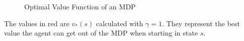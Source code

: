 \begin{figure}[H]
\begin{tikzpicture}[x=0.75pt,y=0.75pt,yscale=-1,xscale=1]
\end{tikzpicture}
\caption{Optimal Value Function of an MDP}
\label{optimalvaluefunction}
\end{figure}

The values in red are $v_*(s)$ calculated with $\gamma = 1$. They represent the best value the agent can get out of the MDP when starting in state $s$.

\begin{figure}[H]
\centering




\begin{tikzpicture}[x=0.75pt,y=0.75pt,yscale=-1,xscale=1]


\end{tikzpicture}
\end{figure}

